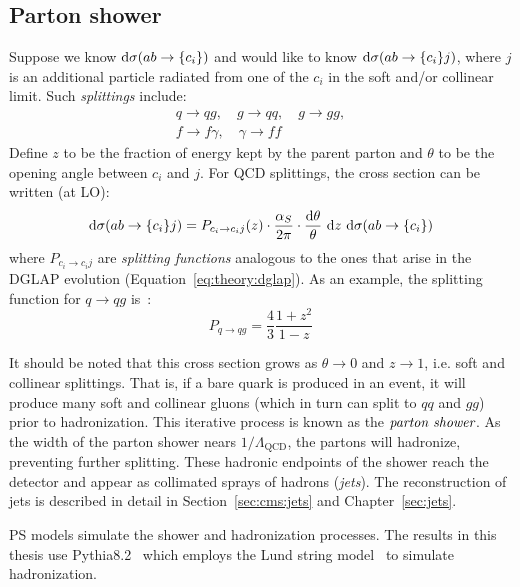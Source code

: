 \subsection{Parton shower}
\label{sec:theory:ps}
Suppose we know $\mathrm{d}\sigma(ab\rightarrow \{c_i\})$ and would like to know $\mathrm{d}\sigma(ab\rightarrow\{c_i\}j)$, where $j$ is an additional particle radiated from one of the $c_i$ in the soft and/or collinear limit.
Such \emph{splittings} include:
\begin{gather}
    q\rightarrow qg, \quad g\rightarrow qq, \quad g\rightarrow gg, \nonumber \\ 
        f\rightarrow f\gamma, \quad \gamma\rightarrow ff 
\end{gather}
Define $z$ to be the fraction of energy kept by the parent parton and $\theta$ to be the opening angle between $c_i$ and $j$. 
For QCD splittings, the cross section can be written (at LO):
\begin{equation}
    \mathrm{d}\sigma(ab\rightarrow\{c_i\}j) =
        P_{c_i \rightarrow c_i j} (z) 
        \cdot \frac{\alpha_S}{2\pi} 
        \cdot \frac{\mathrm{d}\theta}{\theta} 
        ~\mathrm{d} z
        ~\mathrm{d}\sigma(ab\rightarrow\{c_i\})
\end{equation}
where $P_{c_i\rightarrow c_i j}$ are \emph{splitting functions} analogous to the ones that arise in the DGLAP evolution (Equation~\ref{eq:theory:dglap}).
As an example, the splitting function for $q\rightarrow qg$ is~\cite{pythia}:
\begin{equation}
    P_{q\rightarrow qg} = \frac{4}{3} \frac{1+z^2}{1-z}
\end{equation}

It should be noted that this cross section grows as $\theta\rightarrow 0$ and $z\rightarrow 1$, i.e. soft and collinear splittings.
That is, if a bare quark is produced in an event, it will produce many soft and collinear gluons (which in turn can split to $qq$ and $gg$) prior to hadronization.
This iterative process is known as the $\emph{parton shower}$.
As the width of the parton shower nears $1/\Lambda_\mathrm{QCD}$, the partons will hadronize, preventing further splitting.
These hadronic endpoints of the shower reach the detector and appear as collimated sprays of hadrons (\emph{jets}).
The reconstruction of jets is described in detail in Section~\ref{sec:cms:jets} and Chapter~\ref{sec:jets}. 

PS models simulate the shower and hadronization processes.
The results in this thesis use Pythia8.2~\cite{pythia} which employs the Lund string model~\cite{lund} to simulate hadronization.
